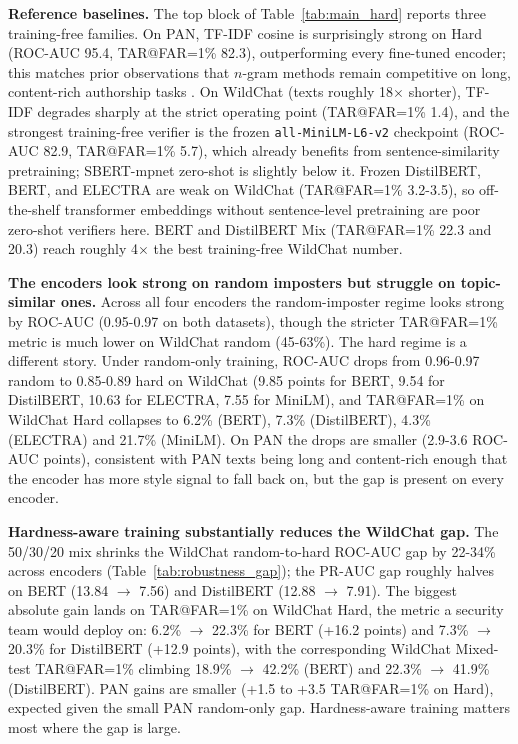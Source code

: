 \documentclass[11pt]{article}
\begin{document}
\noindent\textbf{Reference baselines.} The top block of Table~\ref{tab:main_hard} reports three training-free families. On PAN, TF-IDF cosine is surprisingly strong on Hard (ROC-AUC 95.4, TAR@FAR=1\% 82.3), outperforming every fine-tuned encoder; this matches prior observations that $n$-gram methods remain competitive on long, content-rich authorship tasks \citep{tyo2022state}. On WildChat (texts roughly 18$\times$ shorter), TF-IDF degrades sharply at the strict operating point (TAR@FAR=1\% 1.4), and the strongest training-free verifier is the frozen \texttt{all-MiniLM-L6-v2} checkpoint (ROC-AUC 82.9, TAR@FAR=1\% 5.7), which already benefits from sentence-similarity pretraining; SBERT-mpnet zero-shot is slightly below it. Frozen DistilBERT, BERT, and ELECTRA are weak on WildChat (TAR@FAR=1\% 3.2-3.5), so off-the-shelf transformer embeddings without sentence-level pretraining are poor zero-shot verifiers here. BERT and DistilBERT Mix (TAR@FAR=1\% 22.3 and 20.3) reach roughly 4$\times$ the best training-free WildChat number.

\noindent\textbf{The encoders look strong on random imposters but struggle on topic-similar ones.} Across all four encoders the random-imposter regime looks strong by ROC-AUC (0.95-0.97 on both datasets), though the stricter TAR@FAR=1\% metric is much lower on WildChat random (45-63\%). The hard regime is a different story. Under random-only training, ROC-AUC drops from 0.96-0.97 random to 0.85-0.89 hard on WildChat (9.85 points for BERT, 9.54 for DistilBERT, 10.63 for ELECTRA, 7.55 for MiniLM), and TAR@FAR=1\% on WildChat Hard collapses to 6.2\% (BERT), 7.3\% (DistilBERT), 4.3\% (ELECTRA) and 21.7\% (MiniLM). On PAN the drops are smaller (2.9-3.6 ROC-AUC points), consistent with PAN texts being long and content-rich enough that the encoder has more style signal to fall back on, but the gap is present on every encoder.

\noindent\textbf{Hardness-aware training substantially reduces the WildChat gap.} The 50/30/20 mix shrinks the WildChat random-to-hard ROC-AUC gap by 22-34\% across encoders (Table~\ref{tab:robustness_gap}); the PR-AUC gap roughly halves on BERT (13.84 $\to$ 7.56) and DistilBERT (12.88 $\to$ 7.91). The biggest absolute gain lands on TAR@FAR=1\% on WildChat Hard, the metric a security team would deploy on: 6.2\% $\to$ 22.3\% for BERT (+16.2 points) and 7.3\% $\to$ 20.3\% for DistilBERT (+12.9 points), with the corresponding WildChat Mixed-test TAR@FAR=1\% climbing 18.9\% $\to$ 42.2\% (BERT) and 22.3\% $\to$ 41.9\% (DistilBERT). PAN gains are smaller (+1.5 to +3.5 TAR@FAR=1\% on Hard), expected given the small PAN random-only gap. Hardness-aware training matters most where the gap is large.
\end{document}
